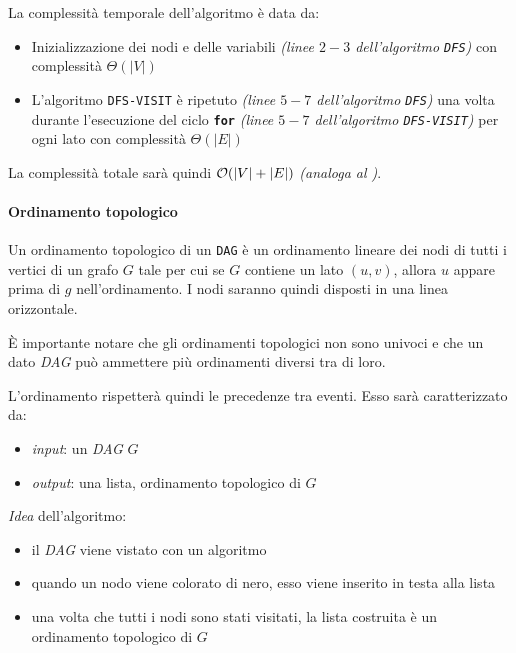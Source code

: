 \documentclass[italian, 10pt]{article}
\begin{document}
La complessità temporale dell'algoritmo è data da:

\begin{itemize}
  \item Inizializzazione dei nodi e delle variabili \textit{(linee \(2-3\) dell'algoritmo \texttt{DFS})} con complessità \(\Theta(|V|)\)
  \item L'algoritmo \texttt{DFS-VISIT} è ripetuto \textit{(linee \(5-7\) dell'algoritmo \texttt{DFS})} una volta durante l'esecuzione del ciclo \textbf{\texttt{for}} \textit{(linee \(5-7\) dell'algoritmo \texttt{DFS-VISIT})} per ogni lato con complessità \(\Theta(|E|)\)
\end{itemize}

La complessità totale sarà quindi \(\mathcal{O}(|V|+|E|)\) \textit{(analoga al \BFS)}.

\paragraph{Ordinamento topologico}

Un ordinamento topologico di un \texttt{DAG} è un ordinamento lineare dei nodi di tutti i vertici di un grafo \(G\) tale per cui se \(G\) contiene un lato \((u, v)\), allora \(u\) appare prima di \(g\) nell'ordinamento.
I nodi saranno quindi disposti in una linea orizzontale.

È importante notare che gli ordinamenti topologici non sono univoci e che un dato \textit{DAG} può ammettere più ordinamenti diversi tra di loro.

L'ordinamento rispetterà quindi le precedenze tra eventi.
Esso sarà caratterizzato da:

\begin{itemize}
  \item \textit{input}: un \textit{DAG} \(G\)
  \item \textit{output}: una lista, ordinamento topologico di \(G\)
\end{itemize}

\bigskip
\textit{Idea} dell'algoritmo:

\begin{itemize}
  \item il \textit{DAG} viene vistato con un algoritmo \DFS
  \item quando un nodo viene colorato di nero, esso viene inserito in testa alla lista
  \item una volta che tutti i nodi sono stati visitati, la lista costruita è un ordinamento topologico di \(G\)
\end{itemize}
\end{document}
